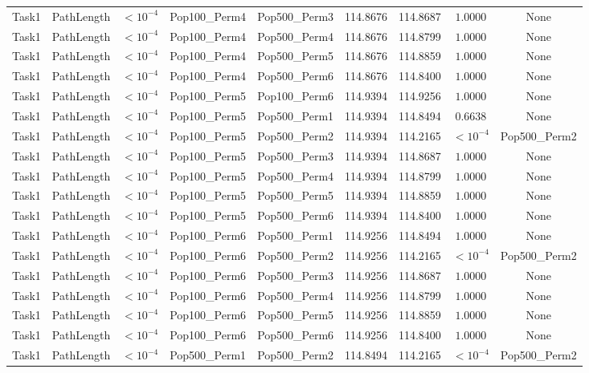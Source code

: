 \documentclass[8pt]{article}
\begin{document}
\begin{longtable}{llccccccc}
Task1 & PathLength & $< 10^{-4}$ & Pop100\_Perm4 & Pop500\_Perm3 & 114.8676 & 114.8687 & $1.0000$ & None \\
Task1 & PathLength & $< 10^{-4}$ & Pop100\_Perm4 & Pop500\_Perm4 & 114.8676 & 114.8799 & $1.0000$ & None \\
Task1 & PathLength & $< 10^{-4}$ & Pop100\_Perm4 & Pop500\_Perm5 & 114.8676 & 114.8859 & $1.0000$ & None \\
Task1 & PathLength & $< 10^{-4}$ & Pop100\_Perm4 & Pop500\_Perm6 & 114.8676 & 114.8400 & $1.0000$ & None \\
Task1 & PathLength & $< 10^{-4}$ & Pop100\_Perm5 & Pop100\_Perm6 & 114.9394 & 114.9256 & $1.0000$ & None \\
Task1 & PathLength & $< 10^{-4}$ & Pop100\_Perm5 & Pop500\_Perm1 & 114.9394 & 114.8494 & $0.6638$ & None \\
Task1 & PathLength & $< 10^{-4}$ & Pop100\_Perm5 & Pop500\_Perm2 & 114.9394 & 114.2165 & $< 10^{-4}$ & Pop500\_Perm2 \\
Task1 & PathLength & $< 10^{-4}$ & Pop100\_Perm5 & Pop500\_Perm3 & 114.9394 & 114.8687 & $1.0000$ & None \\
Task1 & PathLength & $< 10^{-4}$ & Pop100\_Perm5 & Pop500\_Perm4 & 114.9394 & 114.8799 & $1.0000$ & None \\
Task1 & PathLength & $< 10^{-4}$ & Pop100\_Perm5 & Pop500\_Perm5 & 114.9394 & 114.8859 & $1.0000$ & None \\
Task1 & PathLength & $< 10^{-4}$ & Pop100\_Perm5 & Pop500\_Perm6 & 114.9394 & 114.8400 & $1.0000$ & None \\
Task1 & PathLength & $< 10^{-4}$ & Pop100\_Perm6 & Pop500\_Perm1 & 114.9256 & 114.8494 & $1.0000$ & None \\
Task1 & PathLength & $< 10^{-4}$ & Pop100\_Perm6 & Pop500\_Perm2 & 114.9256 & 114.2165 & $< 10^{-4}$ & Pop500\_Perm2 \\
Task1 & PathLength & $< 10^{-4}$ & Pop100\_Perm6 & Pop500\_Perm3 & 114.9256 & 114.8687 & $1.0000$ & None \\
Task1 & PathLength & $< 10^{-4}$ & Pop100\_Perm6 & Pop500\_Perm4 & 114.9256 & 114.8799 & $1.0000$ & None \\
Task1 & PathLength & $< 10^{-4}$ & Pop100\_Perm6 & Pop500\_Perm5 & 114.9256 & 114.8859 & $1.0000$ & None \\
Task1 & PathLength & $< 10^{-4}$ & Pop100\_Perm6 & Pop500\_Perm6 & 114.9256 & 114.8400 & $1.0000$ & None \\
Task1 & PathLength & $< 10^{-4}$ & Pop500\_Perm1 & Pop500\_Perm2 & 114.8494 & 114.2165 & $< 10^{-4}$ & Pop500\_Perm2 \\

\end{longtable}
\end{document}
